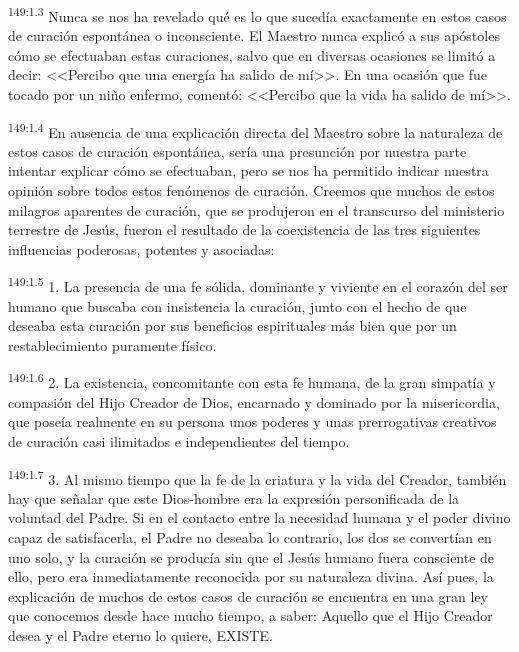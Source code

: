 \par 
\textsuperscript{149:1.3} Nunca se nos ha revelado qué es lo que sucedía exactamente en estos casos de curación espontánea o inconsciente. El Maestro nunca explicó a sus apóstoles cómo se efectuaban estas curaciones, salvo que en diversas ocasiones se limitó a decir: <<Percibo que una energía ha salido de mí>>. En una ocasión que fue tocado por un niño enfermo, comentó: <<Percibo que la vida ha salido de mí>>.

\par 
\textsuperscript{149:1.4} En ausencia de una explicación directa del Maestro sobre la naturaleza de estos casos de curación espontánea, sería una presunción por nuestra parte intentar explicar cómo se efectuaban, pero se nos ha permitido indicar nuestra opinión sobre todos estos fenómenos de curación. Creemos que muchos de estos milagros aparentes de curación, que se produjeron en el transcurso del ministerio terrestre de Jesús, fueron el resultado de la coexistencia de las tres siguientes influencias poderosas, potentes y asociadas:

\par 
\textsuperscript{149:1.5} 1. La presencia de una fe sólida, dominante y viviente en el corazón del ser humano que buscaba con insistencia la curación, junto con el hecho de que deseaba esta curación por sus beneficios espirituales más bien que por un restablecimiento puramente físico.

\par 
\textsuperscript{149:1.6} 2. La existencia, concomitante con esta fe humana, de la gran simpatía y compasión del Hijo Creador de Dios, encarnado y dominado por la misericordia, que poseía realmente en su persona unos poderes y unas prerrogativas creativos de curación casi ilimitados e independientes del tiempo.

\par 
\textsuperscript{149:1.7} 3. Al mismo tiempo que la fe de la criatura y la vida del Creador, también hay que señalar que este Dios-hombre era la expresión personificada de la voluntad del Padre. Si en el contacto entre la necesidad humana y el poder divino capaz de satisfacerla, el Padre no deseaba lo contrario, los dos se convertían en uno solo, y la curación se producía sin que el Jesús humano fuera consciente de ello, pero era inmediatamente reconocida por su naturaleza divina. Así pues, la explicación de muchos de estos casos de curación se encuentra en una gran ley que conocemos desde hace mucho tiempo, a saber: Aquello que el Hijo Creador desea y el Padre eterno lo quiere, EXISTE.

